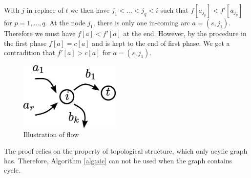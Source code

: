 \documentclass{article}
\theoremstyle{definition}
\begin{document}
With $j$ in replace of $t$ we then have $j_1 < \dots < j_q < i$ such that $f[a_{j_p}] < f'[a_{j_p}]$ for $p=1, \dots, q$. 
At the node $j_1$, there is only one in-coming arc $a=(s, j_1)$. Therefore we must have $f[a] < f'[a]$ at the end. However, by the procedure in the first phase $f[a] = c[a]$ and is kept to the end of first phase. We get a contradition that $f'[a] > c[a]$ for $a=(s,j_1)$. 
\begin{figure}[!ht]
\centering
\includegraphics[width=5cm]{maxflow_proof.eps}
\caption{Illustration of flow}\label{maxflow_proof}
\end{figure}

The proof relies on the property of topological structure, which only acylic graph has.  Therefore,  Algorithm \ref{alg:aic} can not be used when the graph contains cycle.
\end{document}
